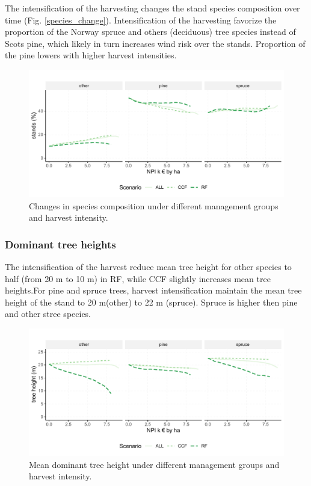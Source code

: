 \documentclass[]{elsarticle} %
\makeatletter
\def\maxwidth{\ifdim\Gin@nat@width>\linewidth\linewidth
\else\Gin@nat@width\fi}
\let\Oldincludegraphics\includegraphics
\renewcommand{\includegraphics}[1]{\Oldincludegraphics[width=\maxwidth]{#1}}
\makeatother
\begin{document}
The intensification of the harvesting changes the stand species
composition over time (Fig. \ref{species_change}). Intensification of
the harvesting favorize the proportion of the Norway spruce and others
(deciduous) tree species instead of Scots pine, which likely in turn
increases wind risk over the stands. Proportion of the pine lowers with
higher harvest intensities.

\begin{figure}
\centering
\includegraphics{test_manus_files/figure-latex/species_change-1.pdf}
\caption{Changes in species composition under different management
groups and harvest intensity.}
\end{figure}

\subsubsection{Dominant tree heights}\label{dominant-tree-heights}

The intensification of the harvest reduce mean tree height for other
species to half (from 20 m to 10 m) in RF, while CCF slightly increases
mean tree heights.For pine and spruce trees, harvest intensification
maintain the mean tree height of the stand to 20 m(other) to 22 m
(spruce). Spruce is higher then pine and other stree species.

\begin{figure}
\centering
\includegraphics{test_manus_files/figure-latex/res_D_tree_height-1.pdf}
\caption{Mean dominant tree height under different management groups and
harvest intensity.}
\end{figure}
\end{document}
